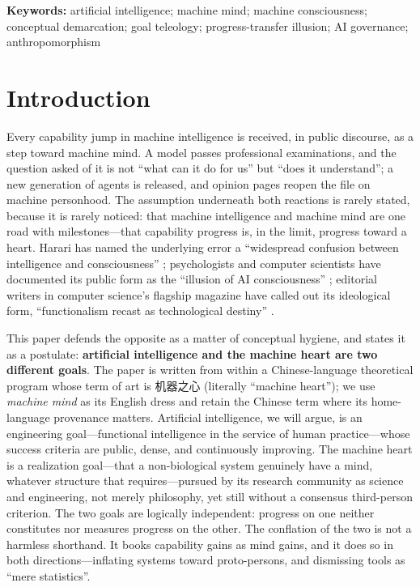 \documentclass[10pt]{article}
\begin{document}
\medskip
\noindent\textbf{Keywords:} artificial intelligence; machine mind; machine consciousness; conceptual demarcation; goal teleology; progress-transfer illusion; AI governance; anthropomorphism

\section{Introduction}\label{sec:intro}

Every capability jump in machine intelligence is received, in public discourse, as a step toward machine mind. A model passes professional examinations, and the question asked of it is not ``what can it do for us'' but ``does it understand''; a new generation of agents is released, and opinion pages reopen the file on machine personhood. The assumption underneath both reactions is rarely stated, because it is rarely noticed: that machine intelligence and machine mind are one road with milestones---that capability progress is, in the limit, progress toward a heart. Harari has named the underlying error a ``widespread confusion between intelligence and consciousness'' \cite{harari2024nexus}; psychologists and computer scientists have documented its public form as the ``illusion of AI consciousness'' \cite{elmoznino2025illusions}; editorial writers in computer science's flagship magazine have called out its ideological form, ``functionalism recast as technological destiny'' \cite{jorge2026harsh}.

This paper defends the opposite as a matter of conceptual hygiene, and states it as a postulate: \textbf{artificial intelligence and the machine heart are two different goals}. The paper is written from within a Chinese-language theoretical program whose term of art is 机器之心 (literally ``machine heart''); we use \emph{machine mind} as its English dress and retain the Chinese term where its home-language provenance matters. Artificial intelligence, we will argue, is an engineering goal---functional intelligence in the service of human practice---whose success criteria are public, dense, and continuously improving. The machine heart is a realization goal---that a non-biological system genuinely have a mind, whatever structure that requires---pursued by its research community as science and engineering, not merely philosophy, yet still without a consensus third-person criterion. The two goals are logically independent: progress on one neither constitutes nor measures progress on the other. The conflation of the two is not a harmless shorthand. It books capability gains as mind gains, and it does so in both directions---inflating systems toward proto-persons, and dismissing tools as ``mere statistics''.
\end{document}
